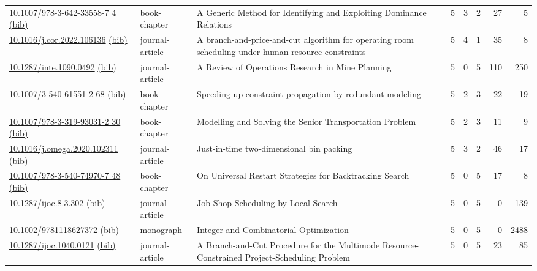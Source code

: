 {\begin{longtable}{p{5cm}lp{11cm}rrrrr}
\href{http://dx.doi.org/10.1007/978-3-642-33558-7_4}{10.1007/978-3-642-33558-7 4} \href{https://www.doi2bib.org/bib/10.1007/978-3-642-33558-7_4}{(bib)} & book-chapter & A Generic Method for Identifying and Exploiting Dominance Relations & 5 & 3 & 2 & 27 & 5 \\
\href{http://dx.doi.org/10.1016/j.cor.2022.106136}{10.1016/j.cor.2022.106136} \href{https://www.doi2bib.org/bib/10.1016/j.cor.2022.106136}{(bib)} & journal-article & A branch-and-price-and-cut algorithm for operating room scheduling under human resource constraints & 5 & 4 & 1 & 35 & 8 \\
\href{http://dx.doi.org/10.1287/inte.1090.0492}{10.1287/inte.1090.0492} \href{https://www.doi2bib.org/bib/10.1287/inte.1090.0492}{(bib)} & journal-article & A Review of Operations Research in Mine Planning & 5 & 0 & 5 & 110 & 250 \\
\href{http://dx.doi.org/10.1007/3-540-61551-2_68}{10.1007/3-540-61551-2 68} \href{https://www.doi2bib.org/bib/10.1007/3-540-61551-2_68}{(bib)} & book-chapter & Speeding up constraint propagation by redundant modeling & 5 & 2 & 3 & 22 & 19 \\
\href{http://dx.doi.org/10.1007/978-3-319-93031-2_30}{10.1007/978-3-319-93031-2 30} \href{https://www.doi2bib.org/bib/10.1007/978-3-319-93031-2_30}{(bib)} & book-chapter & Modelling and Solving the Senior Transportation Problem & 5 & 2 & 3 & 11 & 9 \\
\href{http://dx.doi.org/10.1016/j.omega.2020.102311}{10.1016/j.omega.2020.102311} \href{https://www.doi2bib.org/bib/10.1016/j.omega.2020.102311}{(bib)} & journal-article & Just-in-time two-dimensional bin packing & 5 & 3 & 2 & 46 & 17 \\
\href{http://dx.doi.org/10.1007/978-3-540-74970-7_48}{10.1007/978-3-540-74970-7 48} \href{https://www.doi2bib.org/bib/10.1007/978-3-540-74970-7_48}{(bib)} & book-chapter & On Universal Restart Strategies for Backtracking Search & 5 & 0 & 5 & 17 & 8 \\
\href{http://dx.doi.org/10.1287/ijoc.8.3.302}{10.1287/ijoc.8.3.302} \href{https://www.doi2bib.org/bib/10.1287/ijoc.8.3.302}{(bib)} & journal-article & Job Shop Scheduling by Local Search & 5 & 0 & 5 & 0 & 139 \\
\href{http://dx.doi.org/10.1002/9781118627372}{10.1002/9781118627372} \href{https://www.doi2bib.org/bib/10.1002/9781118627372}{(bib)} & monograph & Integer and Combinatorial Optimization & 5 & 0 & 5 & 0 & 2488 \\
\href{http://dx.doi.org/10.1287/ijoc.1040.0121}{10.1287/ijoc.1040.0121} \href{https://www.doi2bib.org/bib/10.1287/ijoc.1040.0121}{(bib)} & journal-article & A Branch-and-Cut Procedure for the Multimode Resource-Constrained Project-Scheduling Problem & 5 & 0 & 5 & 23 & 85 \\

\end{longtable}}
